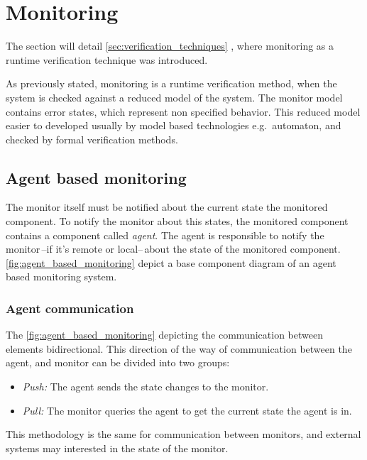 
\chapter{Monitoring}
\label{ch:monitoring}

The section will detail \cref{sec:verification_techniques} , where monitoring as a runtime verification technique was introduced.

As previously stated, monitoring is a runtime verification method, when the system is checked against a reduced model of the system. The monitor model contains error states, which represent non specified behavior. This reduced model easier to developed usually by model based technologies e.g.\ automaton, and checked by formal verification methods.

\section{Agent based monitoring}

The monitor itself must be notified about the current state the monitored component. To notify the monitor about this states, the monitored component contains a component called \emph{agent}. The agent is responsible to notify the monitor\,--if it's remote or local--\,about the state of the monitored component.  \cref{fig:agent_based_monitoring} depict a base component diagram of an agent based monitoring system.

\subsection{Agent communication}

The \cref{fig:agent_based_monitoring} depicting the communication between elements bidirectional. This direction of the way of communication between the agent, and monitor can be divided into two groups:
\begin{itemize}
	\item \emph{Push:} The agent sends the state changes to the monitor.
	\item \emph{Pull:} The monitor queries the agent to get the current state the agent is in.
\end{itemize}

This methodology is the same for communication between monitors, and external systems may interested in the state of the monitor.


